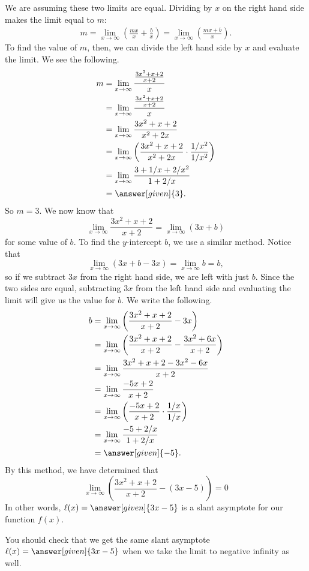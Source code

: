 \documentclass{ximera}
\begin{document}
\begin{example}
\begin{explanation}
    We are assuming these two limits are equal.  Dividing by $x$ on the right hand side makes the limit equal to $m$:
    \begin{align*}
    m = \lim_{x \to \infty} \left(\frac{mx}{x} + \frac{b}{x}\right) = \lim_{x \to \infty} \left(\frac{mx+b}{x}\right).
    \end{align*}
    To find the value of $m$, then, we can divide the left hand side by $x$ and evaluate the limit.   We see the following. 
    \begin{align*}
      m &=\lim_{x\to\infty}\frac{\frac{3x^2+x+2}{x+2}}{x}\\
      &= \lim_{x\to\infty}\frac{\frac{3x^2+x+2}{x+2}}{x}\\
      &= \lim_{x\to\infty}\frac{3x^2+x+2}{x^2+2x}\\
      &= \lim_{x\to\infty}\left(\frac{3x^2+x+2}{x^2+2x}\cdot\frac{1/x^2}{1/x^2}\right)\\
      &= \lim_{x\to\infty}\frac{3+1/x+2/x^2}{1+2/x}\\
      &= \answer[given]{3}.
    \end{align*}
    So $m=3$.  We now know that
    \[
    \lim_{x \to \infty}\frac{3x^2 +x+2}{x+2} = \lim_{x \to \infty} (3x + b)
    \]
    for some value of $b$.  To find the $y$-intercept $b$, we use a similar method.  Notice that
    \[
    \lim_{x \to \infty}( 3x + b - 3x )= \lim_{x \to \infty} b = b,
    \]
    so if we subtract $3x$ from the right hand side, we are left with just $b$.  Since the two sides are equal, subtracting $3x$ from the left hand side and evaluating the limit will give us the value for $b$.  We write the following.
    \begin{align*}
      b &=\lim_{x\to\infty} \left(\frac{3x^2+x+2}{x+2} - 3x\right)\\
      &=\lim_{x\to\infty} \left( \frac{3x^2+x+2}{x+2} - \frac{3x^2 + 6x}{x+2}\right) \\
      &=\lim_{x\to\infty} \frac{3x^2+x+2-3x^2-6x}{x+2}\\
      &=\lim_{x\to\infty}  \frac{-5x+2}{x+2}\\
      &=\lim_{x\to\infty} \left(\frac{-5x+2}{x+2}\cdot\frac{1/x}{1/x}\right)\\
      &=\lim_{x\to\infty} \frac{-5+2/x}{1+2/x}\\
      &= \answer[given]{-5}.
    \end{align*}
    By this method, we have determined that 
    \[
    \lim_{x\to\infty}\left(\frac{3x^2+x+2}{x+2} - (3x-5) \right) = 0
    \]
   In other words, $\l(x) = \answer[given]{3x-5}$ is a slant asymptote for our function $f(x)$.  
   
   You should check that we get the same slant asymptote $\l(x) =
   \answer[given]{3x-5}$ when we take the limit to negative infinity
   as well.
  \end{explanation}
\end{example}
\end{document}
